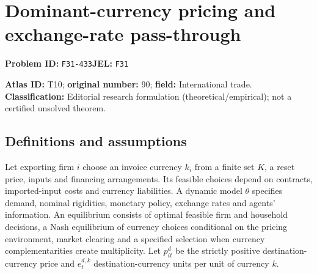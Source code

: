 \documentclass[11pt,a4paper]{article}
\begin{document}
\section*{Dominant-currency pricing and exchange-rate pass-through}
\textbf{Problem ID:} \texttt{F31-433}\quad \textbf{JEL:} \texttt{F31}\par
\label{problem:OP-0090}
\label{atlas:prob:T10}

\noindent\textbf{Atlas ID:} T10; \textbf{original number:} 90; \textbf{field:} International trade. \textbf{Classification:} Editorial research formulation (theoretical/empirical); not a certified unsolved theorem.

\subsection*{Definitions and assumptions}
Let exporting firm $i$ choose an invoice currency $k_i$ from a finite set $K$, a reset price, inputs and financing arrangements. Its feasible choices depend on contracts, imported-input costs and currency liabilities. A dynamic model $\theta$ specifies demand, nominal rigidities, monetary policy, exchange rates and agents’ information. An equilibrium consists of optimal feasible firm and household decisions, a Nash equilibrium of currency choices conditional on the pricing environment, market clearing and a specified selection when currency complementarities create multiplicity. Let $p_{it}^d$ be the strictly positive destination-currency price and $e_t^{d,k}$ destination-currency units per unit of currency $k$.
\end{document}

